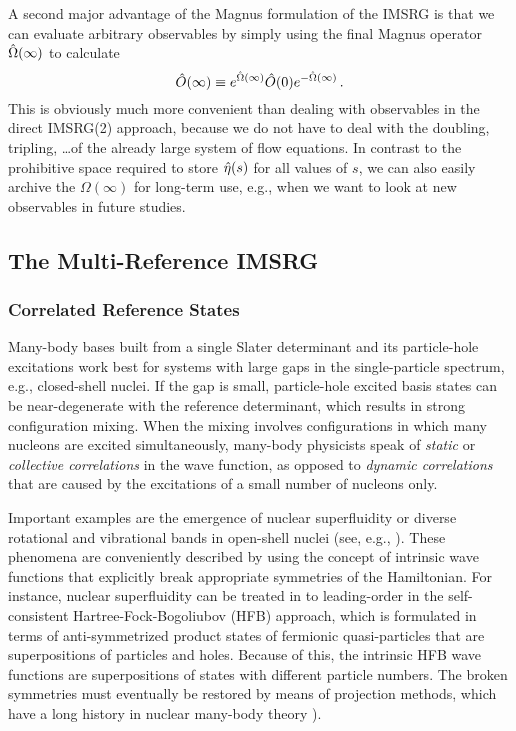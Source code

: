 A second major advantage of the Magnus formulation of the IMSRG is that
we can evaluate arbitrary observables by simply using the final 
Magnus operator $\hat{\Omega}(\infty)$ to calculate
\begin{equation}
  \hat{O}(\infty)\equiv e^{\hat{\Omega}(\infty)}\hat{O}(0) e^{-\hat{\Omega}(\infty)}\,.
\end{equation}
This is obviously much more convenient than dealing with observables
in the direct IMSRG(2) approach, because we do not have to deal with
the doubling, tripling, \ldots of the already large system of flow
equations. In contrast to the prohibitive space required to store 
$\hat{\eta}(s)$ for all values of $s$, we can also easily archive the 
$\Omega(\infty)$ for long-term use, e.g., when we want to look at
new observables in future studies. 

\subsection{\label{sec:current_mrimsrg}The Multi-Reference IMSRG}


%
%
\subsubsection{Correlated Reference States}
Many-body bases built from a single Slater determinant and its particle-hole
excitations work best for systems with large gaps in the single-particle 
spectrum, e.g., closed-shell nuclei. If the gap is small, particle-hole 
excited basis states can be near-degenerate with the reference determinant, 
which results in strong configuration mixing. When the mixing involves 
configurations in which many nucleons are excited simultaneously, many-body 
physicists speak of \emph{static} or \emph{collective correlations} in the 
wave function, as opposed to \emph{dynamic correlations} that are caused by 
the excitations of a small number of nucleons only. 

Important examples are the emergence of nuclear superfluidity \cite{Dean:2003ei}
or diverse rotational and vibrational bands in open-shell nuclei (see, e.g., \cite{Bohr:1999vn}).
These phenomena are conveniently described by using the concept of intrinsic
wave functions that explicitly break appropriate symmetries of the Hamiltonian.
For instance, nuclear superfluidity can be treated in to leading-order in 
the self-consistent Hartree-Fock-Bogoliubov (HFB) approach, which is formulated 
in terms of anti-symmetrized product states of fermionic quasi-particles that 
are superpositions of particles and holes. Because of this, the intrinsic HFB wave 
functions are superpositions of states with different particle numbers. The
broken symmetries must eventually be restored by means of projection methods,
which have a long history in nuclear many-body theory
\cite{Peierls:1973fk,Ring:1980bb,Egido:1982sd,Robledo:1994qf,Flocard:1997fx,Sheikh:2000xx,Dobaczewski:2007hh,Bender:2009rv,Duguet:2009ph,Lacroix:2009aj,Lacroix:2012vn,Duguet:2015ye}).

